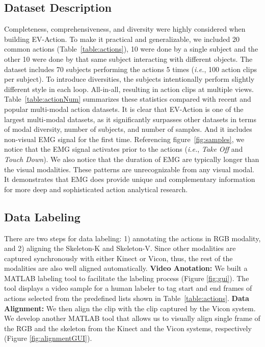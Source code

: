 \documentclass[a4paper, 10pt, conference]{ieeeconf}      \usepackage{FG2020}
\newcommand*\ie{\textit{i.e.}}
\begin{document}
\subsection{Dataset Description}
Completeness, comprehensiveness, and diversity were highly considered when building EV-Action. To make it practical and generalizable, we included 20 common actions (Table~\ref{table:actions}), 10 were done by a single subject and the other 10 were done by that same subject interacting with different objects. The dataset includes 70 subjects performing the actions 5 times (\ie, 100 action clips per subject). To introduce diversities, the subjects intentionally perform slightly different style in each loop. All-in-all, resulting in  action clips at multiple views. Table~\ref{table:actionNum} summarizes these statistics compared with recent and popular multi-modal action datasets. It is clear that EV-Action is one of the largest multi-modal datasets, as it significantly surpasses other datasets in terms of modal diversity, number of subjects, and number of samples. And it includes non-visual EMG signal for the first time. Referencing figure~\ref{fig:samples}, we notice that the EMG signal activates prior to the actions (\ie, \textit{Take Off} and \textit{Touch Down}). We also notice that the duration of EMG are typically longer than the visual modalities. These patterns are unrecognizable from any visual modal. It demonstrates that EMG does provide unique and complementary information for more deep and sophisticated action analytical research.

\subsection{Data Labeling}
There are two steps for data labeling: 1) annotating the actions in RGB modality, and 2) aligning the Skeleton-K and Skeleton-V. Since other modalities are captured synchronously with either Kinect or Vicon, thus, the rest of the modalities are also well aligned automatically. \textbf{Video Anotation:} We built a MATLAB labeling tool to facilitate the labeling process (Figure \ref{fig:gui}). The tool displays a video sample for a human labeler to tag start and end frames of actions selected from the predefined lists shown in Table~\ref{table:actions}. \textbf{Data Alignment:} We then align the clip with the clip captured by the Vicon system. We develop another MATLAB tool that allows us to visually align single frame of the RGB and the skeleton from the Kinect and the Vicon systems, respectively (Figure \ref{fig:alignmentGUI}).
\end{document}
